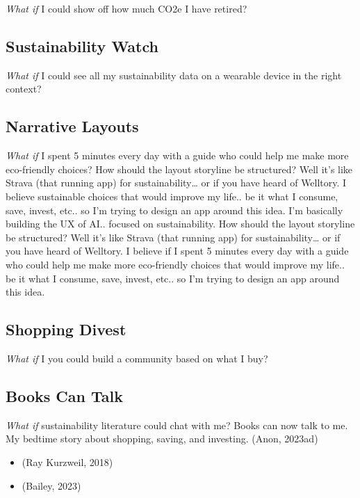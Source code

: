 \documentclass[
  letterpaper,
  DIV=11,
  numbers=noendperiod]{scrartcl}
\providecommand{\tightlist}{%
  \setlength{\itemsep}{0pt}\setlength{\parskip}{0pt}}\usepackage{longtable,booktabs,array}
\begin{document}
\emph{What if} I could show off how much CO2e I have retired?

\subsection{Sustainability Watch}\label{sustainability-watch}

\emph{What if} I could see all my sustainability data on a wearable
device in the right context?

\subsection{Narrative Layouts}\label{narrative-layouts}

\emph{What if} I spent 5 minutes every day with a guide who could help
me make more eco-friendly choices? How should the layout storyline be
structured? Well it's like Strava (that running app) for
sustainability\ldots{} or if you have heard of Welltory. I believe
sustainable choices that would improve my life.. be it what I consume,
save, invest, etc.. so I'm trying to design an app around this idea. I'm
basically building the UX of AI.. focused on sustainability. How should
the layout storyline be structured? Well it's like Strava (that running
app) for sustainability\ldots{} or if you have heard of Welltory. I
believe if I spent 5 minutes every day with a guide who could help me
make more eco-friendly choices that would improve my life.. be it what I
consume, save, invest, etc.. so I'm trying to design an app around this
idea.

\subsection{Shopping Divest}\label{shopping-divest}

\emph{What if} I you could build a community based on what I buy?

\subsection{Books Can Talk}\label{books-can-talk}

\emph{What if} sustainability literature could chat with me? Books can
now talk to me. My bedtime story about shopping, saving, and investing.
(Anon, 2023ad)

\begin{itemize}
\tightlist
\item
  (Ray Kurzweil, 2018)
\item
  (Bailey, 2023)
\end{itemize}
\end{document}
